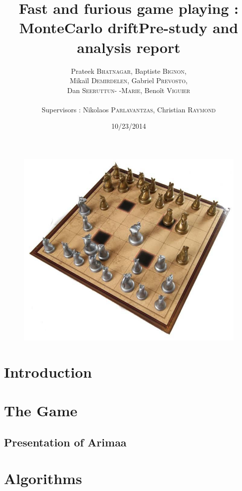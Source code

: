 \documentclass[12pt]{article}
\title{Fast and furious game playing : MonteCarlo drift\smallbreak Pre-study and analysis report}
\author{Prateek \textsc{Bhatnagar}, Baptiste \textsc{Bignon}, \\
        Mikaïl \textsc{Demirdelen}, Gabriel \textsc{Prevosto}, \\
        Dan \textsc{Seeruttun- -Marie}, Benoît \textsc{Viguier} \\
        \\
        Supervisors : Nikolaos \textsc{Parlavantzas}, Christian \textsc{Raymond}}
\date{10/23/2014}
\begin{document}
\maketitle

\begin{figure}[!h] 
\centerline{\includegraphics[scale=0.50]{img/arimaa}}
\end{figure}
\newpage
\begin{abstract}

\end{abstract}



\newpage
\tableofcontents
\newpage


\section*{Introduction}
\newpage
\section{The Game}
\subsection{Presentation of Arimaa} 
\newpage
\section{Algorithms}
\end{document}
